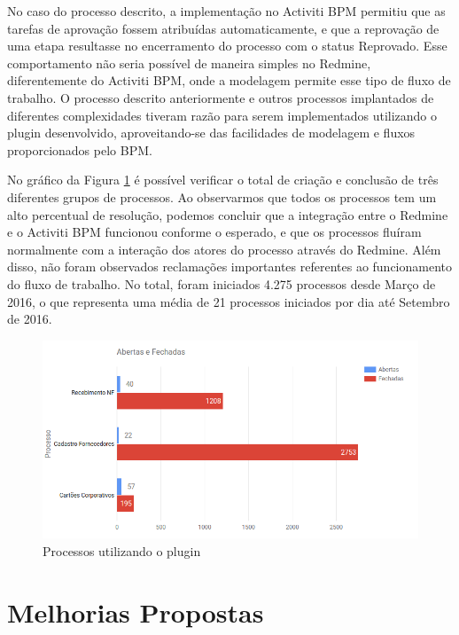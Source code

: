 No caso do processo descrito, a implementação no Activiti BPM permitiu que as tarefas de aprovação fossem atribuídas automaticamente, e que a reprovação de uma etapa resultasse no encerramento do processo com o status Reprovado. Esse comportamento não seria possível de maneira simples no Redmine, diferentemente do Activiti BPM, onde a modelagem permite esse tipo de fluxo de trabalho. O processo descrito anteriormente e outros processos implantados de diferentes complexidades tiveram razão para serem implementados utilizando o plugin desenvolvido, aproveitando-se das facilidades de modelagem e fluxos proporcionados pelo BPM.

No gráfico da Figura \ref{fig:grafico_processo} é possível verificar o total de criação e conclusão de três diferentes grupos de processos. Ao observarmos que todos os processos tem um alto percentual de resolução, podemos concluir que a integração entre o Redmine e o Activiti BPM funcionou conforme o esperado, e que os processos fluíram normalmente com a interação dos atores do processo através do Redmine. Além disso, não foram observados reclamações importantes referentes ao funcionamento do fluxo de trabalho. No total, foram iniciados 4.275 processos desde Março de 2016, o que representa uma média de 21 processos iniciados por dia até Setembro de 2016.

\begin{figure}[H]
\centering
\includegraphics[width=1\textwidth]{imagens/grafico_processo.png}
\caption{Processos utilizando o plugin}
\label{fig:grafico_processo}
\end{figure}


\section{Melhorias Propostas}\label{sec:conclusao-melhorias}

